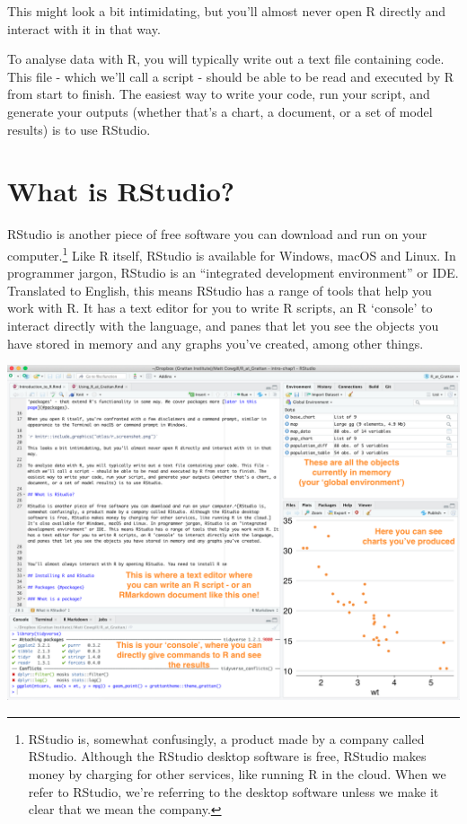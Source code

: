 \documentclass[]{book}
\let\rmarkdownfootnote\footnote%
\def\footnote{\protect\rmarkdownfootnote}
\begin{document}
This might look a bit intimidating, but you'll almost never open R directly and interact with it in that way.

To analyse data with R, you will typically write out a text file containing code. This file - which we'll call a script - should be able to be read and executed by R from start to finish. The easiest way to write your code, run your script, and generate your outputs (whether that's a chart, a document, or a set of model results) is to use RStudio.

\hypertarget{what-is-rstudio}{%
\section{What is RStudio?}\label{what-is-rstudio}}

RStudio is another piece of free software you can download and run on your computer.\footnote{RStudio is, somewhat confusingly, a product made by a company called RStudio. Although the RStudio desktop software is free, RStudio makes money by charging for other services, like running R in the cloud. When we refer to RStudio, we're referring to the desktop software unless we make it clear that we mean the company.} Like R itself, RStudio is available for Windows, macOS and Linux. In programmer jargon, RStudio is an ``integrated development environment'' or IDE. Translated to English, this means RStudio has a range of tools that help you work with R. It has a text editor for you to write R scripts, an R `console' to interact directly with the language, and panes that let you see the objects you have stored in memory and any graphs you've created, among other things.

\includegraphics[width=18.4in]{atlas/rstudio_screenshot}
\end{document}
